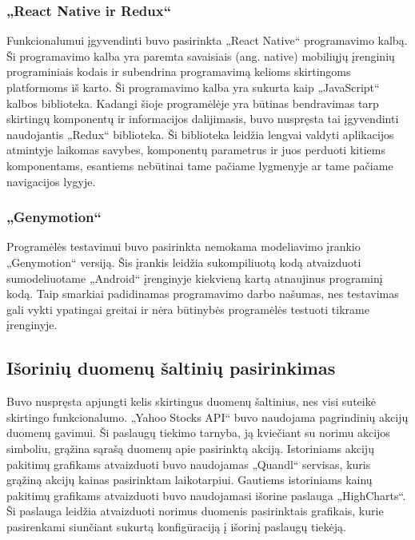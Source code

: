 \documentclass[a4paper,12pt,fleqn]{article}
\begin{document}
\subsubsection{„React Native ir Redux“}
Funkcionalumui įgyvendinti buvo pasirinkta „React Native“ programavimo kalbą. Ši programavimo kalba yra paremta savaisiais (ang. native) mobiliųjų įrenginių programiniais kodais ir subendrina programavimą kelioms skirtingoms platformoms iš karto. Ši programavimo kalba yra sukurta kaip „JavaScript“ kalbos biblioteka. Kadangi šioje programėlėje yra būtinas bendravimas tarp skirtingų komponentų ir informacijos dalijimasis, buvo nuspręsta tai įgyvendinti naudojantis „Redux“ biblioteka. Ši biblioteka leidžia lengvai valdyti aplikacijos atmintyje laikomas savybes, komponentų parametrus ir juos perduoti kitiems komponentams, esantiems nebūtinai tame pačiame lygmenyje ar tame pačiame navigacijos lygyje.
\subsubsection{„Genymotion“}
Programėlės testavimui buvo pasirinkta nemokama modeliavimo įrankio „Genymotion“ versiją. Šis įrankis leidžia sukompiliuotą kodą atvaizduoti sumodeliuotame „Android“ įrenginyje kiekvieną kartą atnaujinus programinį kodą. Taip smarkiai padidinamas programavimo darbo našumas, nes testavimas gali vykti ypatingai greitai ir nėra būtinybės programėlės testuoti tikrame įrenginyje.
\subsection{Išorinių duomenų šaltinių pasirinkimas}
Buvo nuspręsta apjungti kelis skirtingus duomenų šaltinius, nes visi suteikė skirtingo funkcionalumo. „Yahoo Stocks API“ buvo naudojama pagrindinių akcijų duomenų gavimui. Ši paslaugų tiekimo tarnyba, ją kviečiant su norimu akcijos simboliu, grąžina sąrašą duomenų apie pasirinktą akciją. Istoriniams akcijų pakitimų grafikams atvaizduoti buvo naudojamas „Quandl“ servisas, kuris grąžiną akcijų kainas pasirinktam laikotarpiui. Gautiems istoriniams kainų pakitimų grafikams atvaizduoti buvo naudojamasi išorine paslauga „HighCharts“. Ši paslauga leidžia atvaizduoti norimus duomenis pasirinktais grafikais, kurie pasirenkami siunčiant sukurtą konfigūraciją į išorinį paslaugų tiekėją.
\end{document}
